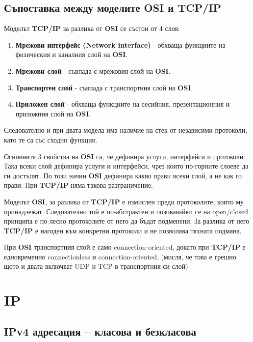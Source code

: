\documentclass[fleqn,12pt]{article}
\begin{document}
\subsection{Съпоставка между моделите OSI и TCP/IP}

Моделът \textbf{TCP/IP} за разлика от \textbf{OSI} се състои от 4 слоя:
\begin{enumerate}
    \item \textbf{Мрежови интерфейс (Network interface)} - обхваща функциите на физическия и каналния слой на \textbf{OSI}.
    \item \textbf{Мрежови слой} - съвпада с мрежовия слой на \textbf{OSI}.
    \item \textbf{Транспортен слой} - съвпада с транспортния слой на \textbf{OSI}.
    \item \textbf{Приложен слой} - обхваща функциите на сесийния, презентационния и приложния слой на \textbf{OSI}.
\end{enumerate}

Следователно и при двата модела има наличие на стек от независими протоколи, като те са със сходни функции.

Основните 3 свойства на \textbf{OSI} са, че дефинира услуги, интерфейси и протоколи. Така всеки слой дефинира услуги и интерфейси, чрез които по-горните слоеве да ги достъпят.
По този начин \textbf{OSI} дефинира какво прави всеки слой, а не как го прави. При \textbf{TCP/IP} няма такова разграничение.

Моделът \textbf{OSI}, за разлика от \textbf{TCP/IP} е измислен преди протоколите, които му принадлежат.
Следователно той е по-абстрактен и позовавайки се на open/closed принципа е по-лесно протоколите от него да бъдат подменени.
За разлика от него \textbf{TCP/IP} е нагоден към конкретни протоколи и не позволява тяхната подмяна.

При \textbf{OSI} транспортния слой е само connection-oriented, докато при \textbf{TCP/IP} е едновременно connectionless и connection-oriented. (мисля, че това е грешно щото и двата включват UDP и TCP в транспортния си слой)

\section{IP}

\subsection{IPv4 адресация – класова и безкласова}
\end{document}
